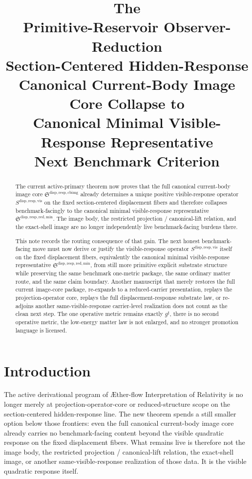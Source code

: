 \documentclass[11pt]{article}
\title{\textbf{The \TheoryName{}}\\[0.4em]
\large Primitive-Reservoir Observer-Reduction\\
\large Section-Centered Hidden-Response\\
\large Canonical Current-Body Image Core Collapse to\\
\large Canonical Minimal Visible-Response Representative\\
\large Next Benchmark Criterion}
\author{}
\date{}
\newcommand{\Aflow}{\AE{}ther-flow}
\newcommand{\TheoryName}{\Aflow{} Interpretation of Relativity}
\newcommand{\CompletedMetric}{g^{\sharp}}
\newcommand{\CurrentBodyImageCore}{\mathfrak S^{\mathrm{disp,resp,cbimg}}}
\newcommand{\VisibleResponseOperator}{S^{\mathrm{disp,resp,vis}}}
\newcommand{\MinimalReducedStructure}{\mathfrak S^{\mathrm{disp,resp,red,min}}}
\begin{document}
\maketitle

\begin{abstract}
The current active-primary theorem now proves that the full canonical current-body image core \(\CurrentBodyImageCore\) already determines a unique positive visible-response operator \(\VisibleResponseOperator\) on the fixed section-centered displacement fibers and therefore collapses benchmark-facingly to the canonical minimal visible-response representative \(\MinimalReducedStructure\). The image body, the restricted projection / canonical-lift relation, and the exact-shell image are no longer independently live benchmark-facing burdens there.

This note records the routing consequence of that gain. The next honest benchmark-facing move must now derive or justify the visible-response operator \(\VisibleResponseOperator\) itself on the fixed displacement fibers, equivalently the canonical minimal visible-response representative \(\MinimalReducedStructure\), from still more primitive explicit substrate structure while preserving the same benchmark one-metric package, the same ordinary matter route, and the same claim boundary. Another manuscript that merely restores the full current image-core package, re-expands to a reduced-carrier presentation, replays the projection-operator core, replays the full displacement-response substrate law, or re-adjoins another same-visible-response carrier-level realization does not count as the clean next step. The one operative metric remains exactly \(\CompletedMetric\), there is no second operative metric, the low-energy matter law is not enlarged, and no stronger promotion language is licensed.
\end{abstract}

\section{Introduction}

The active derivational program of \TheoryName{} is no longer merely at projection-operator-core or reduced-structure scope on the section-centered hidden-response line. The new theorem spends a still smaller option below those frontiers: even the full canonical current-body image core already carries no benchmark-facing content beyond the visible quadratic response on the fixed displacement fibers. What remains live is therefore not the image body, the restricted projection / canonical-lift relation, the exact-shell image, or another same-visible-response realization of those data. It is the visible quadratic response itself.
\end{document}

